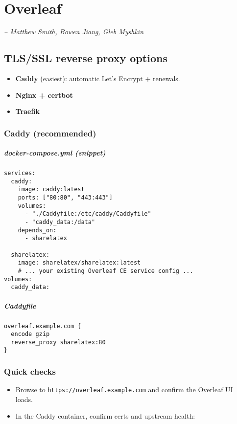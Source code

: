 \chapter{Overleaf}
\small\textit{-- Matthew Smith, Bowen Jiang, Gleb Myshkin}

\section*{TLS/SSL reverse proxy options}
\begin{itemize}[leftmargin=*]
  \item \textbf{Caddy} (easiest): automatic Let's Encrypt + renewals.
  \item \textbf{Nginx + certbot}
  \item \textbf{Traefik}
\end{itemize}

\subsection*{Caddy (recommended)}
\paragraph{docker-compose.yml (snippet)}
\begin{verbatim}
services:
  caddy:
    image: caddy:latest
    ports: ["80:80", "443:443"]
    volumes:
      - "./Caddyfile:/etc/caddy/Caddyfile"
      - "caddy_data:/data"
    depends_on:
      - sharelatex

  sharelatex:
    image: sharelatex/sharelatex:latest
    # ... your existing Overleaf CE service config ...
volumes:
  caddy_data:
\end{verbatim}

\paragraph{Caddyfile}
\begin{verbatim}
overleaf.example.com {
  encode gzip
  reverse_proxy sharelatex:80
}
\end{verbatim}


\subsection*{Quick checks}
\begin{itemize}[leftmargin=*]
  \item Browse to \texttt{https://overleaf.example.com} and confirm the Overleaf UI loads.
  \item In the Caddy container, confirm certs and upstream health:
\end{itemize}

